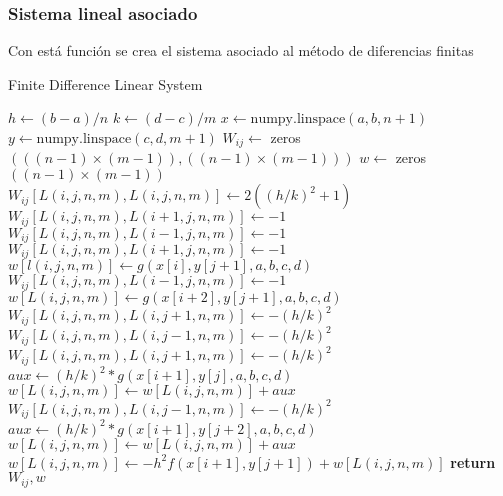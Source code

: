 \documentclass[a4paper]{article}
\begin{document}
\subsubsection{Sistema lineal asociado}
Con está función se crea el sistema asociado al método de diferencias finitas
\begin{algorithm}[H]
\caption{Finite Difference Linear System}\label{alg::finite_difference}
\begin{algorithmic}[H]
\State $h \gets (b-a)/n$
\State $k \gets (d-c)/m$
\State $x \gets \text{numpy.linspace}(a, b, n+1)$
\State $y \gets \text{numpy.linspace}(c, d, m+1)$
\State $W_{ij} \gets$ zeros $(((n-1)\times(m-1)),((n-1)\times(m-1)))$
\State $w \gets$ zeros $((n-1)\times(m-1))$
\State $W_{ij}[L(i,j,n,m), L(i,j,n,m)] \gets 2((h/k)^2 + 1)$
\State $W_{ij}[L(i,j,n,m), L(i+1,j,n,m)] \gets -1$
\State $W_{ij}[L(i,j,n,m), L(i-1,j,n,m)] \gets -1$
\Else
{}
\State $W_{ij}[L(i,j,n,m), L(i+1,j,n,m)] \gets -1$
\State $w[l(i,j,n,m)] \gets g(x[i], y[j+1], a, b, c, d)$
\EndIf
{}
\State $W_{ij}[L(i,j,n,m), L(i-1,j,n,m)] \gets -1$
\State $w[L(i,j,n,m)] \gets g(x[i+2], y[j+1], a, b, c, d)$
\EndIf
\EndIf
{}
\State $W_{ij}[L(i,j,n,m), L(i,j+1,n,m)] \gets-(h/k)^2$
\State $W_{ij}[L(i,j,n,m), L(i,j-1,n,m)] \gets-(h/k)^2$
\Else
{}
\State $W_{ij}[L(i,j,n,m), L(i,j+1,n,m)] \gets -(h/k)^2$
\State $aux\gets (h/k)^2*g(x[i+1],y[j],a,b,c,d)$
\State $w[L(i,j,n,m)] \gets w[L(i,j,n,m)]+ aux$
\EndIf
{}
\State $W_{ij}[L(i,j,n,m), L(i,j-1,n,m)] \gets -(h/k)^2$
\State $aux\gets (h/k)^2*g(x[i+1],y[j+2],a,b,c,d)$
\State $w[L(i,j,n,m)] \gets w[L(i,j,n,m)]+ aux$
\EndIf
\EndIf
\State $w[L(i,j,n,m)] \gets-h^2f(x[i+1],y[j+1])+w[L(i,j,n,m)]$
\EndFor
\EndFor
\State \textbf{return} $W_{ij}, w$
\EndFunction
\end{algorithmic}
\end{algorithm}
\end{document}
